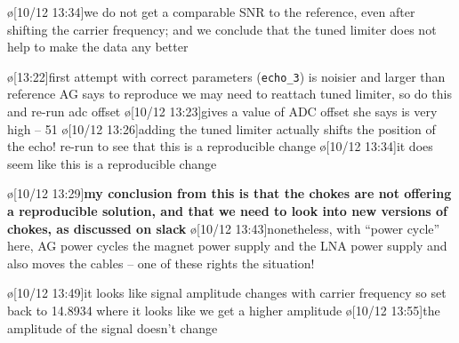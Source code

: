 \o[10/12 13:34]{we do not get a comparable SNR to the reference, even after shifting the carrier frequency; and we conclude that the tuned limiter does not help to make the data any better}
\begin{err}
    \o[13:22]{first attempt with correct parameters (\texttt{echo_3}) is noisier and larger than reference}
    AG says to reproduce we may need to reattach tuned limiter, so do this and re-run adc offset
    \o[10/12 13:23]{gives a value of ADC offset she says is very high -- 51}
    \o[10/12 13:26]{adding the tuned limiter actually shifts the position of the echo!}
    re-run to see that this is a reproducible change
    \o[10/12 13:34]{it does seem like this is a reproducible change}
\end{err}
\o[10/12 13:29]{\textbf{my conclusion from this is that the chokes are not offering a reproducible solution, and that we need to look into new versions of chokes, as discussed on slack}}
\o[10/12 13:43]{nonetheless, with ``power cycle'' here, AG power cycles the magnet power supply and the LNA power supply and also moves the cables -- one of these rights the situation!}
\begin{err}
    \o[10/12 13:49]{it looks like signal amplitude changes with carrier frequency}
    so set back to 14.8934 where it looks like we get a higher amplitude
    \o[10/12 13:55]{the amplitude of the signal doesn't change}
\end{err}
\par

